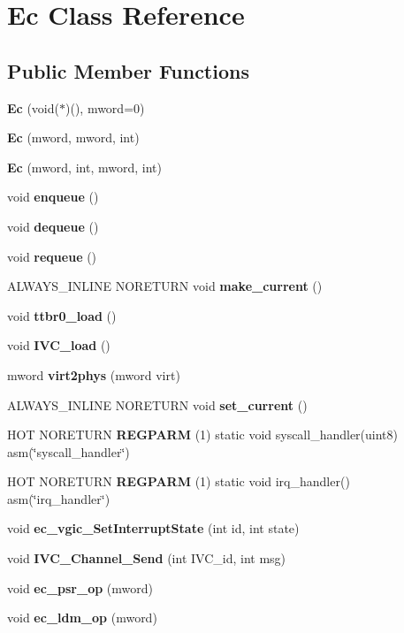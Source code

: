 \section{Ec Class Reference}
\label{class_ec}
\subsection*{Public Member Functions}
\begin{DoxyCompactItemize}
\item 
\mbox{\label{class_ec_aca4cf3d4d39d8dd718f1dc2481981765}} 
{\bfseries Ec} (void($\ast$)(), mword=0)
\item 
\mbox{\label{class_ec_a5f97a31b4d3e1902e2b143f7ba22f0f8}} 
{\bfseries Ec} (mword, mword, int)
\item 
\mbox{\label{class_ec_a9bcab666ed2cf4e3f9bf5816f740abec}} 
{\bfseries Ec} (mword, int, mword, int)
\item 
\mbox{\label{class_ec_ab2a7f6eba7adf6a5cee930f1e927549e}} 
void {\bfseries enqueue} ()
\item 
\mbox{\label{class_ec_a2c3d93ceec2ba9900ae06f6645455367}} 
void {\bfseries dequeue} ()
\item 
\mbox{\label{class_ec_ae8d95032b1ef65b65952334262021611}} 
void {\bfseries requeue} ()
\item 
\mbox{\label{class_ec_a76f6ffa24e94a737fe707654347befe9}} 
A\+L\+W\+A\+Y\+S\+\_\+\+I\+N\+L\+I\+NE N\+O\+R\+E\+T\+U\+RN void {\bfseries make\+\_\+current} ()
\item 
\mbox{\label{class_ec_a48429f8d3ee01ab5dcdff8e119ce8c1b}} 
void {\bfseries ttbr0\+\_\+load} ()
\item 
\mbox{\label{class_ec_a101b15d87f76ea4a8f5098a02e976511}} 
void {\bfseries I\+V\+C\+\_\+load} ()
\item 
\mbox{\label{class_ec_a02ce459e0544f0a00c74b36ecce7d3b9}} 
mword {\bfseries virt2phys} (mword virt)
\item 
\mbox{\label{class_ec_ac10f4f3787e1a4d24c7f36ddbabb87cc}} 
A\+L\+W\+A\+Y\+S\+\_\+\+I\+N\+L\+I\+NE N\+O\+R\+E\+T\+U\+RN void {\bfseries set\+\_\+current} ()
\item 
\mbox{\label{class_ec_a5bd0daf272651cedabfa35e7a53edfc9}} 
H\+OT N\+O\+R\+E\+T\+U\+RN {\bfseries R\+E\+G\+P\+A\+RM} (1) static void syscall\+\_\+handler(uint8) asm(\char`\"{}syscall\+\_\+handler\char`\"{})
\item 
\mbox{\label{class_ec_a61deb71d9640755feaf7728d407470c3}} 
H\+OT N\+O\+R\+E\+T\+U\+RN {\bfseries R\+E\+G\+P\+A\+RM} (1) static void irq\+\_\+handler() asm(\char`\"{}irq\+\_\+handler\char`\"{})
\item 
\mbox{\label{class_ec_aad06e555674442d935cd6e236bff857f}} 
void {\bfseries ec\+\_\+vgic\+\_\+\+Set\+Interrupt\+State} (int id, int state)
\item 
\mbox{\label{class_ec_a8ddc57668d7e5b472c361d8fb013aa4c}} 
void {\bfseries I\+V\+C\+\_\+\+Channel\+\_\+\+Send} (int I\+V\+C\+\_\+id, int msg)
\item 
\mbox{\label{class_ec_aa2eec436dd02d01950770fdc4e789cb0}} 
void {\bfseries ec\+\_\+psr\+\_\+op} (mword)
\item 
\mbox{\label{class_ec_a6b865ea31a22203d976a2dce37e8ea37}} 
void {\bfseries ec\+\_\+ldm\+\_\+op} (mword)
\end{DoxyCompactItemize}
